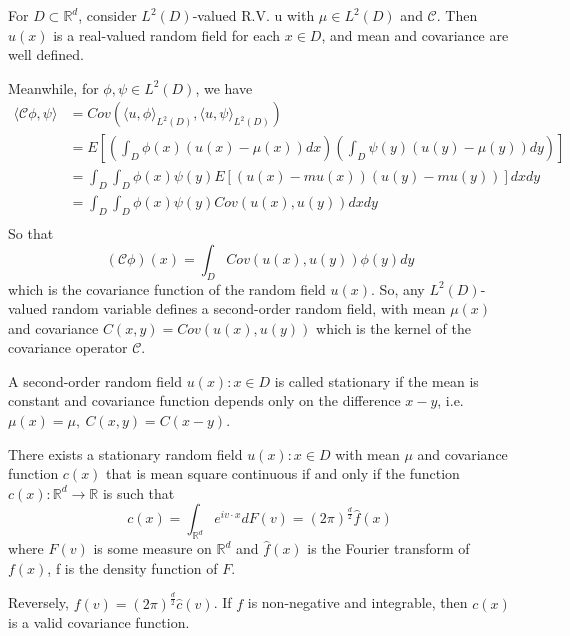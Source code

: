 \begin{example}
    For $D\subset \mathbb{R}^d$, consider $L^2(D)$-valued R.V. u with $\mu \in L^2(D)$ and $\mathscr{C}$.
    Then $u(x)$ is a real-valued random field for each $x\in D$, and mean and covariance are well defined.

    Meanwhile, for $\phi, \psi \in L^2(D)$, we have
    \begin{equation}
        \begin{aligned}
            \langle \mathscr{C}\phi, \psi \rangle &= Cov\left(\langle u, \phi \rangle_{L^2(D)}, \langle u, \psi \rangle_{L^2(D)}\right)\\
            &=E\left[\left(\int_D \phi(x)(u(x)-\mu(x))dx\right)\left(\int_D \psi(y)(u(y)-\mu(y))dy\right)\right]\\
            &=\int_D \int_D \phi(x)\psi(y)E[(u(x)-mu(x))(u(y)-mu(y))]dxdy\\
            &=\int_D \int_D \phi(x)\psi(y)Cov(u(x), u(y))dxdy\\
        \end{aligned}
    \end{equation}
    So that
    \begin{equation}
        (\mathscr{C}\phi)(x) = \int_D Cov(u(x), u(y))\phi(y)dy
    \end{equation}
    which is the covariance function of the random field $u(x)$. So, any $L^2(D)$-valued random variable defines a second-order random field, 
    with mean $\mu(x)$ and covariance $C(x, y) = Cov(u(x), u(y))$ which is the kernel of the covariance operator $\mathscr{C}$.
\end{example}

\begin{example}
    A second-order random field ${u(x): x\in D}$ is called stationary if the mean is constant and covariance function 
    depends only on the difference $x-y$, i.e. $\mu(x) = \mu,\ C(x, y) = C(x-y)$.
\end{example}

\begin{theorem}
    There exists a stationary random field ${u(x): x\in D}$ with mean $\mu$ and covariance function $c(x)$ that is mean square continuous if and only if 
    the function $c(x): \mathbb{R}^d\rightarrow \mathbb{R}$ is such that 
    \begin{equation}
        c(x) = \int_{\mathbb{R}^d} e^{iv \cdot x}dF(v) = (2\pi)^{\frac{d}{2}}\hat{f}(x)
    \end{equation}
    where $F(v)$ is some measure on $\mathbb{R}^d$ and $\hat{f}(x)$ is the Fourier transform of $f(x)$, f is the density function of $F$.
    
    Reversely, $f(v) = (2\pi)^{\frac{d}{2}}\hat{c}(v)$.
    If $f$ is non-negative and integrable, then $c(x)$ is a valid covariance function.
\end{theorem}

